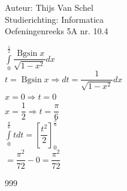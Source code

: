 \documentclass[a4paper]{article}
\newcommand{\dint}{\displaystyle\int}
\newcommand{\Bgsin}{\operatorname{Bgsin}}
\begin{document}
  
\noindent \large Auteur: Thijs Van Schel \\
\noindent \large Studierichting: Informatica\\
\noindent \large Oefeningenreeks 5A nr. 10.4\\

\medskip

\normalsize

$\dint\limits_0^{\tfrac{1}{2}}\dfrac{\Bgsin x}{\sqrt{1-x^2}}dx$\\

$t=\Bgsin x \Rightarrow dt = \dfrac{1}{\sqrt{1-x^2}}dx$\\

$x=0 \Rightarrow t=0$\\

$x=\dfrac{1}{2} \Rightarrow t=\dfrac{\pi}{6}$\\

$\dint\limits_0^{\tfrac{\pi}{6}}tdt = \left[\dfrac{t^2}{2}\right]_0^{\tfrac{\pi}{6}}$\\

$=\dfrac{\pi^2}{72}-0 = \dfrac{\pi^2}{72}$
\begin{thebibliography}{999}
\end{thebibliography}
\end{document}
